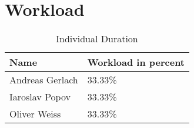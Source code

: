 \section{Workload}
\begin{table}[H]
    \begin{tabular}{|p{}|p{}|}
    \hline
    \textbf{Name} & \textbf{Workload in percent} \\ \hline
    Andreas Gerlach & 33.33\% \\ \hline 
Iaroslav Popov & 33.33\% \\ \hline 
Oliver Weiss & 33.33\% \\ \hline 
    \end{tabular}
    \caption{Individual Duration}
\end{table}

